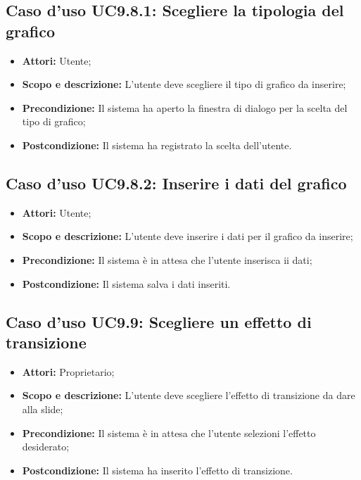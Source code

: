 	\subsection{Caso d'uso UC9.8.1: Scegliere la tipologia del grafico}
	\begin{itemize}
		\item \textbf{Attori:} Utente;
		\item \textbf{Scopo e descrizione:} L'utente deve scegliere il tipo di grafico da inserire;
		\item \textbf{Precondizione:} Il sistema ha aperto la finestra di dialogo per la scelta del tipo di grafico;
		\item \textbf{Postcondizione:} Il sistema ha registrato la scelta dell'utente.
	\end{itemize}
	
	\subsection{Caso d'uso UC9.8.2: Inserire i dati del grafico}
	\begin{itemize}
		\item \textbf{Attori:} Utente;
		\item \textbf{Scopo e descrizione:} L'utente deve inserire i dati per il grafico da inserire;
		\item \textbf{Precondizione:} Il sistema è in attesa che l'utente inserisca ii dati;
		\item \textbf{Postcondizione:} Il sistema salva i dati inseriti.
	\end{itemize}


\subsection{Caso d'uso UC9.9: Scegliere un effetto di transizione}
\begin{itemize}
	\item \textbf{Attori:} Proprietario;
	\item \textbf{Scopo e descrizione:} L'utente deve scegliere l'effetto di transizione da dare alla slide;
	\item \textbf{Precondizione:} Il sistema è in attesa che l'utente selezioni l'effetto desiderato;
	\item \textbf{Postcondizione:} Il sistema ha inserito l'effetto di transizione.
\end{itemize}


